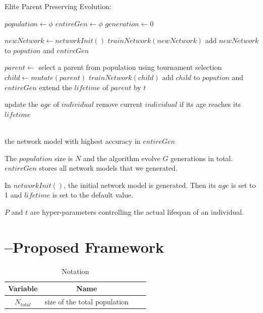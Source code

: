 \documentclass[conference]{IEEEtran}
\begin{document}
  \begin{algorithm}[htb]  
    \caption{ Elite Parent Preserving Evolution:}
    \begin{algorithmic}[1]  
  
    \State $population\gets \phi$
    \State $entireGen\gets \phi$
    \State $generation\gets 0$
    
    \State $newNetwork\gets networkInit()$
    \State $trainNetwork(newNetwork)$
    \State add $newNetwork$ to $popution$ and $entireGen$
    \EndWhile
    
  
    
      \State $parent\gets$ select a parent from population using tournament selection 
      \State $child \gets mutate(parent)$
      \State $trainNetwork(child)$
      \State add $child$ to $popution$ and $entireGen$
        \State extend the $lifetime$ of $parent$ by $t$
      \EndIf
      
        \State update the $age$ of $individual$
        \State remove current $individual$ if its age reaches its $lifetime$
      \EndFor
      
      
    \EndWhile
    
    
    \\  
    \Return the network model with highest accuracy in $entireGen$
 
  \end{algorithmic}  
  \end{algorithm}  

The $population$ size is $N$ and the algorithm evolve $G$ generations in total. $entireGen$ stores all network models that we generated. 
     
In $networkInit()$, the initial network model is generated. Then its $age $ is set to 1 and $lifetime$ is set to the default value. 

$P$ and $t$ are hyper-parameters controlling the actual lifespan of an individual.




\section{--Proposed Framework}
 
  \begin{table}[H]
    
    \centering
      \begin{tabular}{cccc}
      \toprule
      Variable&Name\\
      \midrule
     
      $N_{total}$&size of the total population\\
  \bottomrule
  \end{tabular}
  \caption{Notation}
  \label{table:1}
  \end{table}
\end{document}
